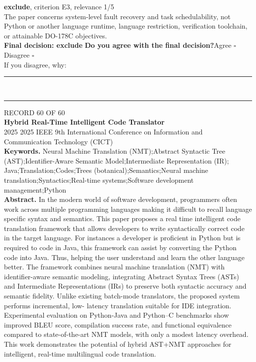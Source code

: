 \documentclass[11pt,a4paper]{article}
\begin{document}
{\small\textbf{exclude}, criterion E3, relevance 1/5}\\[0.5mm]
{\small The paper concerns system-level fault recovery and task schedulability, not Python or another language runtime, language restriction, verification toolchain, or attainable DO-178C objectives.}\\[2.5mm]
{\small\textbf{Final decision: exclude}}
\vspace{2mm}
{\small\textbf{Do you agree with the final decision?}\quad{}Agree $\square$\qquad{}Disagree $\square$}\\[1mm]
{\footnotesize\color{soft}If you disagree, why:}\\[1mm]
\color{rule}\rule{\linewidth}{0.3pt}\\[3mm]\rule{\linewidth}{0.3pt}\color{black}
\clearpage
{\color{soft}\footnotesize RECORD 60 OF 60}\\[1mm]
{\large\bfseries Hybrid Real-Time Intelligent Code Translator}\\[1.5mm]
{\color{soft}\small 2025 \textperiodcentered{} 2025 IEEE 9th International Conference on Information and Communication Technology (CICT)}\\[2mm]
{\small\textbf{Keywords.} Neural Machine Translation (NMT);Abstract Syntactic Tree (AST);Identifier-Aware Semantic Model;Intermediate Representation (IR); Java;Translation;Codes;Trees (botanical);Semantics;Neural machine translation;Syntactics;Real-time systems;Software development management;Python}\\[2mm]
{\small\textbf{Abstract.} In the modern world of software development, programmers often work across multiple programming languages making it difficult to recall language specific syntax and semantics. This paper proposes a real time intelligent code translation framework that allows developers to write syntactically correct code in the target language. For instances a developer is proficient in Python but is required to code in Java, this framework can assist by converting the Python code into Java. Thus, helping the user understand and learn the other language better. The framework combines neural machine translation (NMT) with identifier-aware semantic modeling, integrating Abstract Syntax Trees (ASTs) and Intermediate Representations (IRs) to preserve both syntactic accuracy and semantic fidelity. Unlike existing batch-mode translators, the proposed system performs incremental, low- latency translation suitable for IDE integration. Experimental evaluation on Python-Java and Python--C benchmarks show improved BLEU score, compilation success rate, and functional equivalence compared to state-of-the-art NMT models, with only a modest latency overhead. This work demonstrates the potential of hybrid AST+NMT approaches for intelligent, real-time multilingual code translation.}
\end{document}
